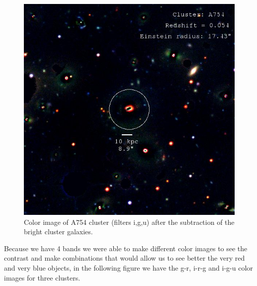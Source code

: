 \begin{figure}[H]
\centering
\includegraphics[width=12cm]{images/cA754_galfit.jpg}
\caption[Color image of A754 after fitting the bright objects]{Color image of A754 cluster (filters i,g,u) after the subtraction of the bright cluster galaxies.}
\end{figure}

Because we have 4 bands we were able to make different color images to see the contrast and make combinations that would allow us to see better the very red and very blue objects, in the following figure we have the g-r, i-r-g and i-g-u color images for three clusters. 

